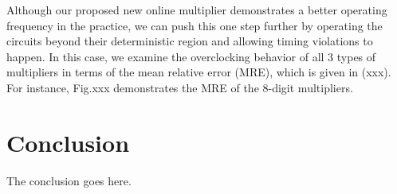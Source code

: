 \documentclass[conference]{IEEEtran}
\begin{document}
Although our proposed new online multiplier demonstrates a better operating frequency in the practice, we can push this one step further by operating the circuits beyond their deterministic region and allowing timing violations to happen. In this case, we examine the overclocking behavior of all 3 types of multipliers in terms of the mean relative error (MRE), which is given in (xxx). For instance, Fig.xxx demonstrates the MRE of the 8-digit multipliers.\cite{Ercegovac_DSPOnline}




%
%


%



\section{Conclusion}
The conclusion goes here.
\end{document}
